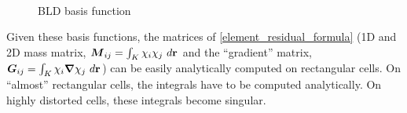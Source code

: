 \begin{figure}[H]
\centering    
{}
\\
\caption{BLD basis function}
\label{bld}
\end{figure}
Given these basis functions, the matrices of
\cref{element_residual_formula} (1D and 2D mass matrix, $\boldsymbol{M}_{ij} = \int_K
\chi_i \chi_j\ d\mathbf{r}$ and the ``gradient'' matrix, $\boldsymbol{G}_{ij} = \int_K \chi_i
\boldsymbol{\nabla} \chi_j\ d\mathbf{r}$) can be easily analytically computed on rectangular cells.
On ``almost'' rectangular cells, the integrals have to be computed
analytically. On highly distorted cells, these integrals become singular.
